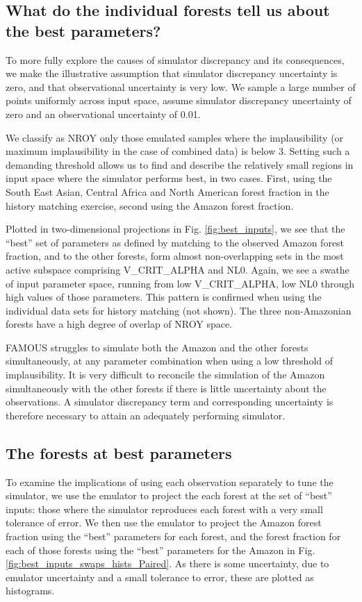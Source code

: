 \documentclass[esd, manuscript]{copernicus}
\begin{document}
\subsection{What do the individual forests tell us about the best parameters?}\label{ssec:learn}
To more fully explore the causes of simulator discrepancy and its consequences, we make the illustrative assumption that simulator discrepancy uncertainty is zero, and that observational uncertainty is very low. We sample a large number of points uniformly across input space, assume simulator discrepancy uncertainty of zero and an observational uncertainty of 0.01.

We classify as NROY only those emulated samples where the implausibility (or maximum implausibility in the case of combined data) is below 3. Setting such a demanding threshold allows us to find and describe the relatively small regions in input space where the simulator performs best, in two cases. First, using the South East Asian, Central Africa and North American forest fraction in the history matching exercise, second using the Amazon forest fraction.


Plotted in two-dimensional projections in Fig. \ref{fig:best_inputs}, we see that the ``best'' set of parameters as defined by matching to the observed Amazon forest fraction, and to the other forests, form almost non-overlapping sets in the most active subspace comprising V\_CRIT\_ALPHA and NL0. Again, we see a swathe of input parameter space, running from low V\_CRIT\_ALPHA, low NL0 through high values of those parameters. This pattern is confirmed when using the individual data sets for history matching (not shown). The three non-Amazonian forests have a high degree of overlap of NROY space.

FAMOUS struggles to simulate both the Amazon and the other forests simultaneously, at any parameter combination when using a low threshold of implausibility. It is very difficult to reconcile the simulation of the Amazon simultaneously with the other forests if there is little uncertainty about the observations. A simulator discrepancy term and corresponding uncertainty is therefore necessary to attain an adequately performing simulator.


\subsection{The forests at best parameters}\label{ssec:bestparameters}
To examine the implications of using each observation separately to tune the simulator, we use the emulator to project the each forest at the set of ``best'' inputs: those where the simulator reproduces each forest with a very small tolerance of error. We then use the emulator to project the Amazon forest fraction using the ``best'' parameters for each forest, and the forest fraction for each of those forests using the ``best'' parameters for the Amazon in Fig. \ref{fig:best_inputs_swaps_hists_Paired}. As there is some uncertainty, due to emulator uncertainty and a small tolerance to error, these are plotted as histograms.
\end{document}
